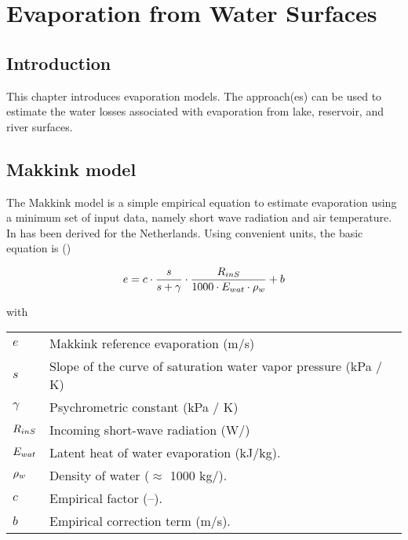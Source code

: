 \chapter{Evaporation from Water Surfaces} \label{chap:evap}
\renewcommand{\tabdir}{chapters/part_processes/evaporation/tab}
\renewcommand{\figdir}{chapters/part_processes/evaporation/fig}

\section{Introduction} \label{sec:evap_intro}

This chapter introduces evaporation models. The approach(es) can be used to estimate the water losses associated with evaporation from lake, reservoir, and river surfaces.


\section{Makkink model} \label{sec:evap_makkink}

The Makkink model is a simple empirical equation to estimate evaporation using a minimum set of input data, namely short wave radiation and air temperature. In has been derived for the Netherlands. Using convenient units, the basic equation is ()

\begin{equation} \label{eqn:evap_makkink_main}
  e = c \cdot \frac{s}{s + \gamma} \cdot \frac{R_{inS}}{1000 \cdot E_{wat} \cdot \rho_{w}} + b
\end{equation}

with

\begin{tabular}{lp{}}
  $e$ & Makkink reference evaporation (m/s) \\
  $s$ & Slope of the curve of saturation water vapor pressure (kPa / K) \\
  $\gamma$ & Psychrometric constant (kPa / K) \\
  $R_{inS}$ & Incoming short-wave radiation (W/\sqm{}) \\
  $E_{wat}$ & Latent heat of water evaporation (kJ/kg). \\
  $\rho_{w}$ & Density of water ($\approx$ 1000 kg/\cbm{}). \\
  $c$ & Empirical factor (--). \\
  $b$ & Empirical correction term (m/s). \\
\end{tabular}


